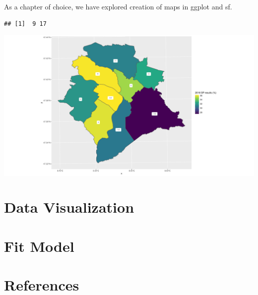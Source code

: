 \documentclass[
]{article}
\begin{document}
As a chapter of choice, we have explored creation of maps in ggplot and
sf.

\begin{verbatim}
## [1]  9 17
\end{verbatim}

\includegraphics{report_files/figure-latex/plot map-1.pdf}

\pagebreak

\hypertarget{data-visualization}{%
\section{Data Visualization}\label{data-visualization}}

\pagebreak

\hypertarget{fit-model}{%
\section{Fit Model}\label{fit-model}}

\pagebreak

\hypertarget{references}{%
\section{References}\label{references}}
\end{document}
